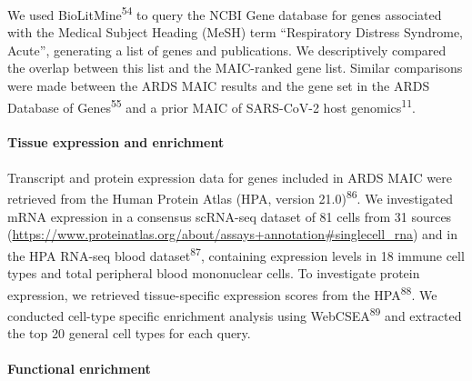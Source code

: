 \documentclass[
  11,
  a4paper,
]{article}
\let\oldparagraph\paragraph
\renewcommand{\paragraph}[1]{\oldparagraph{#1}\mbox{}}
\begin{document}
We used BioLitMine\textsuperscript{54} to query the NCBI Gene database
for genes associated with the Medical Subject Heading (MeSH) term
``Respiratory Distress Syndrome, Acute'', generating a list of genes and
publications. We descriptively compared the overlap between this list
and the MAIC-ranked gene list. Similar comparisons were made between the
ARDS MAIC results and the gene set in the ARDS Database of
Genes\textsuperscript{55} and a prior MAIC of SARS-CoV-2 host
genomics\textsuperscript{11}.

\paragraph{Tissue expression and
enrichment}\label{tissue-expression-and-enrichment}

Transcript and protein expression data for genes included in ARDS MAIC
were retrieved from the Human Protein Atlas (HPA, version
21.0)\textsuperscript{86}. We investigated mRNA expression in a
consensus scRNA-seq dataset of 81 cells from 31 sources
(\url{https://www.proteinatlas.org/about/assays+annotation\#singlecell_rna})
and in the HPA RNA-seq blood dataset\textsuperscript{87}, containing
expression levels in 18 immune cell types and total peripheral blood
mononuclear cells. To investigate protein expression, we retrieved
tissue-specific expression scores from the HPA\textsuperscript{88}. We
conducted cell-type specific enrichment analysis using
WebCSEA\textsuperscript{89} and extracted the top 20 general cell types
for each query.

\paragraph{Functional enrichment}\label{functional-enrichment-1}
\end{document}
